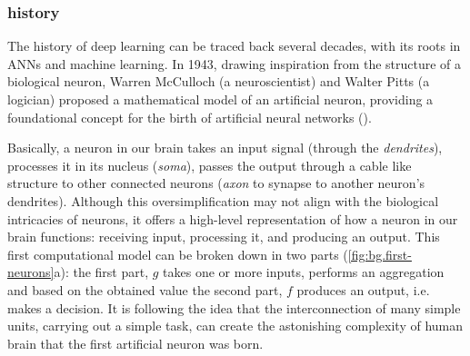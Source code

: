 \documentclass[binding=0.6cm]{sapthesis}
\newcommand{\mycite}[1]{(\cite{#1})}
\begin{document}
\subsubsection{history}
\label{sec:bg.gnn.DL-history}
The history of deep learning can be traced back several decades, with its roots in ANNs and machine learning. In 1943, drawing inspiration from the structure of a biological neuron, Warren McCulloch (a neuroscientist) and Walter Pitts (a logician) proposed a mathematical model of an artificial neuron, providing a foundational concept for the birth of artificial neural networks \mycite{mcculloch-pitts-1943}.   

Basically, a neuron in our brain takes an input signal (through the \textit{dendrites}), processes it in its nucleus (\textit{soma}), passes the output through a cable like structure to other connected neurons (\textit{axon} to synapse to another neuron’s dendrites). Although this oversimplification may not align with the biological intricacies of neurons, it offers a high-level representation of how a neuron in our brain functions: receiving input, processing it, and producing an output. This first computational model can be broken down in two parts (\cref{fig:bg.first-neurons}a): the first part, $g$ takes one or more inputs, performs an aggregation and based on the obtained value the second part, $f$ produces an output, i.e. makes a decision. It is following the idea that the interconnection of many simple units, carrying out a simple task, can create the astonishing complexity of human brain that the first artificial neuron was born.
\end{document}
